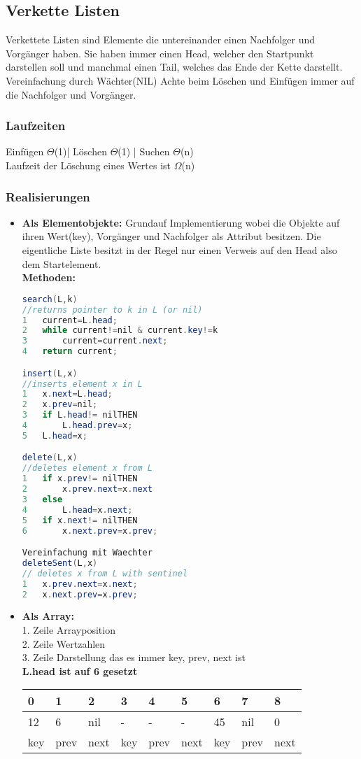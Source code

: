 \documentclass[jou,apacite]{apa6}
\begin{document}
\subsection{Verkette Listen}
Verkettete Listen sind Elemente die untereinander einen Nachfolger und Vorgänger haben. Sie haben immer einen Head, welcher den Startpunkt darstellen soll und manchmal einen Tail, welches das Ende der Kette darstellt. Vereinfachung durch Wächter(NIL) Achte beim Löschen und Einfügen immer auf die Nachfolger und Vorgänger. \\
\subsubsection{Laufzeiten}
Einfügen    $\Theta$(1)| Löschen $\Theta$(1) | Suchen $\Theta$(n) \\
Laufzeit der Löschung eines Wertes ist $\Omega$(n) \\
\subsubsection{Realisierungen}
\begin{itemize}
\item {\bfseries Als Elementobjekte:}
Grundauf Implementierung wobei die Objekte auf ihren Wert(key), Vorgänger und Nachfolger als Attribut besitzen. Die eigentliche Liste besitzt in der Regel nur einen Verweis auf den Head also dem Startelement. \\
{\bfseries Methoden:} 
\begin{lstlisting}[language=java]
search(L,k)   
//returns pointer to k in L (or nil)
1   current=L.head;
2   while current!=nil & current.key!=k 
3       current=current.next;
4   return current;

insert(L,x)
//inserts element x in L
1   x.next=L.head;
2   x.prev=nil;
3   if L.head!= nilTHEN 
4       L.head.prev=x;
5   L.head=x;

delete(L,x)   
//deletes element x from L
1   if x.prev!= nilTHEN
2       x.prev.next=x.next
3   else
4       L.head=x.next;
5   if x.next!= nilTHEN
6       x.next.prev=x.prev;

Vereinfachung mit Waechter
deleteSent(L,x) 
// deletes x from L with sentinel
1   x.prev.next=x.next;
2   x.next.prev=x.prev;
\end{lstlisting}
\item {\bfseries Als Array:} \\
1. Zeile Arrayposition \\
2. Zeile Wertzahlen \\
3. Zeile Darstellung das es immer key, prev, next ist \\
{\bfseries L.head ist auf 6 gesetzt}
\begin{table}[h]
\centering
\begin{tabular}{|l|l|l|l|l|l|l|l|l|}
\hline
0 & 1 & 2 & 3 & 4 & 5 & 6 & 7 & 8  \\
\hline
12 & 6 & nil & - & - & - & 45 & nil & 0  \\
\hline
key & prev & next & key & prev & next & key & prev & next  \\
\hline
\end{tabular}
\end{table}
\end{itemize}
\end{document}
